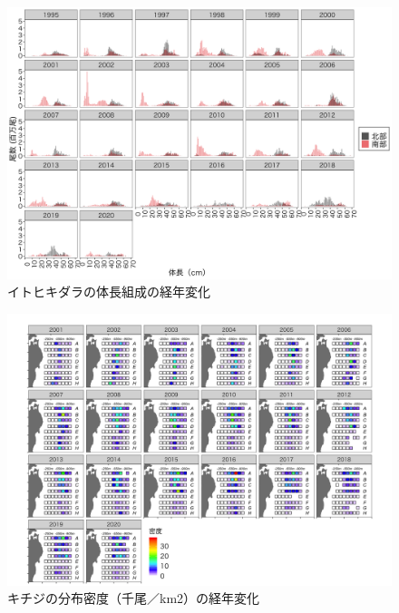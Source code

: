 \documentclass[11pt]{article} %
\begin{document}
\begin{linenumbers}
\begin{figure}[h]
  \centering
  \includegraphics[width = 14cm]{イトヒキダラlength.png}
  \caption{イトヒキダラの体長組成の経年変化}
\end{figure}

\begin{figure}[h]
  \centering
  \includegraphics[width = 14cm]{キチジdens.png}
  \caption{キチジの分布密度（千尾／km2）の経年変化}
\end{figure}


\end{linenumbers}
\end{document}
